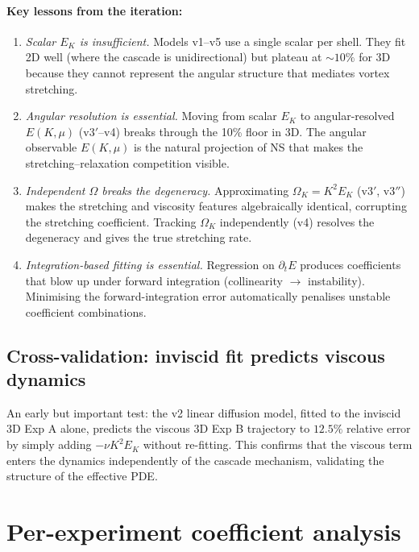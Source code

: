\documentclass[11pt,a4paper]{article}
\theoremstyle{remark}
\begin{document}
\paragraph{Key lessons from the iteration:}
\begin{enumerate}
\item \emph{Scalar $E_K$ is insufficient.}  Models v1--v5 use a single scalar per shell.  They fit 2D well (where the cascade is unidirectional) but plateau at $\sim 10\%$ for 3D because they cannot represent the angular structure that mediates vortex stretching.
\item \emph{Angular resolution is essential.}  Moving from scalar $E_K$ to angular-resolved $E(K, \mu)$ (v3$'$--v4) breaks through the 10\% floor in 3D.  The angular observable $E(K, \mu)$ is the natural projection of NS that makes the stretching--relaxation competition visible.
\item \emph{Independent $\Omega$ breaks the degeneracy.}  Approximating $\Omega_K = K^2 E_K$ (v3$'$, v3$''$) makes the stretching and viscosity features algebraically identical, corrupting the stretching coefficient.  Tracking $\Omega_K$ independently (v4) resolves the degeneracy and gives the true stretching rate.
\item \emph{Integration-based fitting is essential.}  Regression on $\partial_t E$ produces coefficients that blow up under forward integration (collinearity $\to$ instability).  Minimising the forward-integration error automatically penalises unstable coefficient combinations.
\end{enumerate}

\subsection{Cross-validation: inviscid fit predicts viscous dynamics}

An early but important test: the v2 linear diffusion model, fitted to the inviscid 3D Exp A alone, predicts the viscous 3D Exp B trajectory to $12.5\%$ relative error by simply adding $-\nu K^2 E_K$ without re-fitting.  This confirms that the viscous term enters the dynamics independently of the cascade mechanism, validating the structure of the effective PDE.

\section{Per-experiment coefficient analysis}\label{sec:per-experiment}
\end{document}
